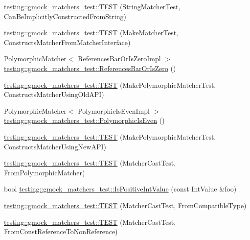 \begin{DoxyCompactItemize}
\item 
\hyperlink{namespacetesting_1_1gmock__matchers__test_a6786eca17f1fc4d6250470cc21ec79f1}{testing\+::gmock\+\_\+matchers\+\_\+test\+::\+T\+E\+ST} (String\+Matcher\+Test, Can\+Be\+Implicitly\+Constructed\+From\+String)
\item 
\hyperlink{namespacetesting_1_1gmock__matchers__test_ae433e93168010d7316b40ef4a5088d09}{testing\+::gmock\+\_\+matchers\+\_\+test\+::\+T\+E\+ST} (Make\+Matcher\+Test, Constructs\+Matcher\+From\+Matcher\+Interface)
\item 
Polymorphic\+Matcher$<$ References\+Bar\+Or\+Is\+Zero\+Impl $>$ \hyperlink{namespacetesting_1_1gmock__matchers__test_ac07376a5dff45a905b7eb96e621ce3aa}{testing\+::gmock\+\_\+matchers\+\_\+test\+::\+References\+Bar\+Or\+Is\+Zero} ()
\item 
\hyperlink{namespacetesting_1_1gmock__matchers__test_aad0604e47fea147ae133d134b4606a26}{testing\+::gmock\+\_\+matchers\+\_\+test\+::\+T\+E\+ST} (Make\+Polymorphic\+Matcher\+Test, Constructs\+Matcher\+Using\+Old\+A\+PI)
\item 
Polymorphic\+Matcher$<$ Polymorphic\+Is\+Even\+Impl $>$ \hyperlink{namespacetesting_1_1gmock__matchers__test_a8a0035a0de2d219d89ff7070762ece72}{testing\+::gmock\+\_\+matchers\+\_\+test\+::\+Polymorphic\+Is\+Even} ()
\item 
\hyperlink{namespacetesting_1_1gmock__matchers__test_a619d872aa86419c5093327f64c466df3}{testing\+::gmock\+\_\+matchers\+\_\+test\+::\+T\+E\+ST} (Make\+Polymorphic\+Matcher\+Test, Constructs\+Matcher\+Using\+New\+A\+PI)
\item 
\hyperlink{namespacetesting_1_1gmock__matchers__test_afffaa6f2c436edb7c46e7a16ed2de825}{testing\+::gmock\+\_\+matchers\+\_\+test\+::\+T\+E\+ST} (Matcher\+Cast\+Test, From\+Polymorphic\+Matcher)
\item 
bool \hyperlink{namespacetesting_1_1gmock__matchers__test_a68565741c989968637db5a9e10e55020}{testing\+::gmock\+\_\+matchers\+\_\+test\+::\+Is\+Positive\+Int\+Value} (const Int\+Value \&foo)
\item 
\hyperlink{namespacetesting_1_1gmock__matchers__test_aa7a28536a6c59d56bbbbdb4fa5ba9e4d}{testing\+::gmock\+\_\+matchers\+\_\+test\+::\+T\+E\+ST} (Matcher\+Cast\+Test, From\+Compatible\+Type)
\item 
\hyperlink{namespacetesting_1_1gmock__matchers__test_a9d25aac0defd9296bf207cacd342aff0}{testing\+::gmock\+\_\+matchers\+\_\+test\+::\+T\+E\+ST} (Matcher\+Cast\+Test, From\+Const\+Reference\+To\+Non\+Reference)
\item 

\end{DoxyCompactItemize}
